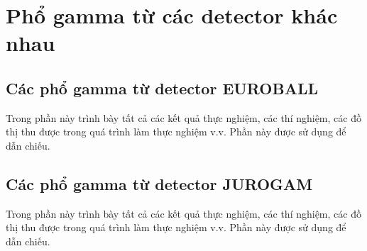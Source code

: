 \chapter{Phổ gamma từ các detector khác nhau}
\label{phuluc:cacdothi}

\section{Các phổ gamma từ detector EUROBALL} 
Trong phần này trình bày tất cả các kết quả thực nghiệm, các thí nghiệm, các đồ thị thu được trong quá trình làm thực nghiệm v.v. Phần này được sử dụng để dẫn chiếu.

\section{Các phổ gamma từ detector JUROGAM}
Trong phần này trình bày tất cả các kết quả thực nghiệm, các thí nghiệm, các đồ thị thu được trong quá trình làm thực nghiệm v.v. Phần này được sử dụng để dẫn chiếu.
